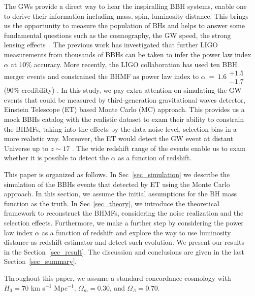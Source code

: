 \documentclass[twocolumn]{aastex62}
\begin{document}
The GWs provide a direct way to hear the inspiralling BBH systems, enable one to derive their information including mass, spin, luminosity distance\citep{Abbott2017phy}. This brings us the opportunity to measure the population of BHs \citep{Abbott2018b} and helps to answer some fundamental questions such as the cosmography\citep{Liao2017, Ding2019, Cai2017}, the GW speed\citep{Fan2017, Collett2017}, the strong lensing effects~\citep{Ola2013, Biesiada2014, Ding2015}. 
The previous work \citet{Kovetz2017PhRvD} has investigated that further LIGO measurements from thousands of BBHs can be taken to infer the power law index $\alpha$ at 10\% accuracy. More recently, the LIGO collaboration has used ten BBH merger events and constrained the BHMF as power law index to $\alpha~=~1.6\substack{+1.5\\-1.7}$ (90\% credibility) \citep{Abbott2018b}. In this study, we pay extra attention on simulating the GW events that could be measured by third-generation gravitational waves detector, Einstein Telescope (ET) \citep{Abernathy2011} based Monte Carlo (MC) approach. This provides us a mock BBHs catalog with the realistic dataset to exam their ability to constrain the BHMFs, taking into the effects by the data noise level, selection bias in a more realistic way. Moreover, the ET would detect the GW event at distant Universe up to $z\sim17$ \citep{Abernathy2011}. The wide redshift range of the events enable us to exam whether it is possible to detect the $\alpha$ as a function of redshift.

This paper is organized as follows. In Sec~\ref{sec_simulation} we describe the simulation of the BBHs events that detected by ET using the Monte Carlo approach. In this section, we assume the initial assumptions for the BH mass function as the truth. In Sec~\ref{sec_theory}, we introduce the theoretical framework to reconstruct the BHMFs, considering the noise realization and the selection effects. Furthermore, we make a further step by considering the power law index $\alpha$ as a function of redshift and explore the way to use luminosity distance as redshift estimator and detect such evolution. We present our results in the Section~\ref{sec_result}. The discussion and conclusions are given in the last Section~\ref{sec_summary}.

Throughout this paper, we assume a standard concordance cosmology with $H_0= 70$ km s$^{-1}$ Mpc$^{-1}$, $\Omega{_m} = 0.30$, and $\Omega{_\Lambda} = 0.70$.

\vspace{1cm}
\end{document}
